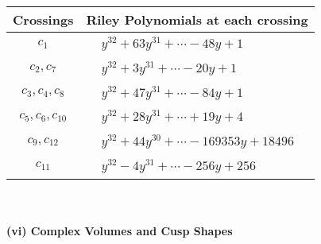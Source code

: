 \documentclass[1p]{elsarticle_modified}
\theoremstyle{definition}
\begin{document}
\begin{tabular}{m{50pt}|m{274pt}}
Crossings & \hspace{64pt}Riley Polynomials at each crossing \\
\hline $$\begin{aligned}c_{1}\end{aligned}$$&$\begin{aligned}
&y^{32}+63 y^{31}+\cdots-48 y+1
\end{aligned}$\\
\hline $$\begin{aligned}c_{2},c_{7}\end{aligned}$$&$\begin{aligned}
&y^{32}+3 y^{31}+\cdots-20 y+1
\end{aligned}$\\
\hline $$\begin{aligned}c_{3},c_{4},c_{8}\end{aligned}$$&$\begin{aligned}
&y^{32}+47 y^{31}+\cdots-84 y+1
\end{aligned}$\\
\hline $$\begin{aligned}c_{5},c_{6},c_{10}\end{aligned}$$&$\begin{aligned}
&y^{32}+28 y^{31}+\cdots+19 y+4
\end{aligned}$\\
\hline $$\begin{aligned}c_{9},c_{12}\end{aligned}$$&$\begin{aligned}
&y^{32}+44 y^{30}+\cdots-169353 y+18496
\end{aligned}$\\
\hline $$\begin{aligned}c_{11}\end{aligned}$$&$\begin{aligned}
&y^{32}-4 y^{31}+\cdots-256 y+256
\end{aligned}$\\
\hline
\end{tabular}\\~\\
\newpage\flushleft \textbf{(vi) Complex Volumes and Cusp Shapes}
\end{document}
